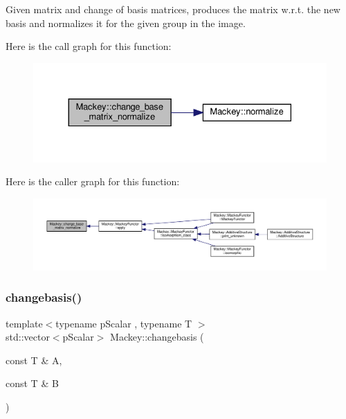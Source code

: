 Given matrix and change of basis matrices, produces the matrix w.\+r.\+t. the new basis and normalizes it for the given group in the image. 

Here is the call graph for this function\+:\nopagebreak
\begin{figure}[H]
\begin{center}
\leavevmode
\includegraphics[width=330pt]{namespaceMackey_a65dac6a38a02a4efc56d52292ea8cbd8_cgraph}
\end{center}
\end{figure}
Here is the caller graph for this function\+:\nopagebreak
\begin{figure}[H]
\begin{center}
\leavevmode
\includegraphics[width=350pt]{namespaceMackey_a65dac6a38a02a4efc56d52292ea8cbd8_icgraph}
\end{center}
\end{figure}
\mbox{\label{namespaceMackey_aa2823da3a4b93dca63e00e50a6bc9fdf}} 
\subsubsection{\texorpdfstring{changebasis()}{changebasis()}}
{\footnotesize\ttfamily template$<$typename p\+Scalar , typename T $>$ \\
std\+::vector$<$p\+Scalar$>$ Mackey\+::changebasis (\begin{DoxyParamCaption}\item[{const T \&}]{A,  }\item[{const T \&}]{B }\end{DoxyParamCaption})}



